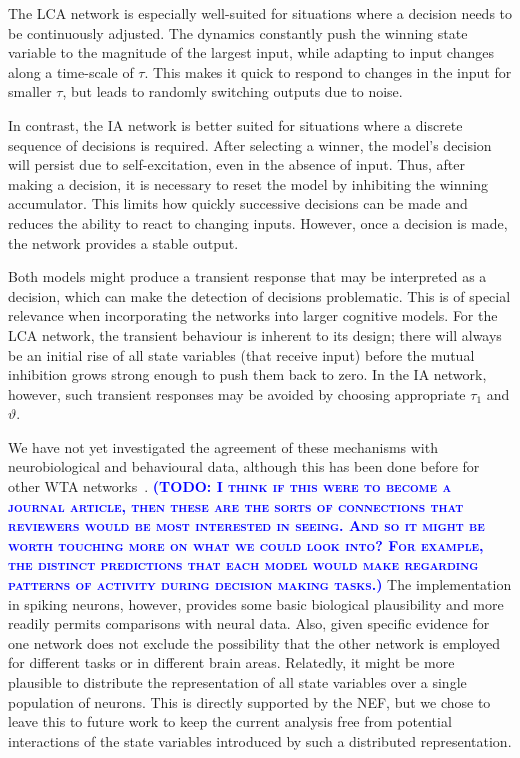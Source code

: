 \documentclass[10pt,letterpaper]{article}
\makeatletter
\newcommand{\todo}[1]{\textbf{\textsc{\textcolor{blue}{(TODO\@: #1)}}}}
\makeatother
\begin{document}
The LCA network is especially well-suited for situations where a decision needs to be continuously adjusted.
The dynamics constantly push the winning state variable to the magnitude of the largest input, while adapting to input changes along a time-scale of $\tau$.
This makes it quick to respond to changes in the input for smaller $\tau$, but leads to randomly switching outputs due to noise.

In contrast, the IA network is better suited for situations where a discrete sequence of decisions is required.
After selecting a winner, the model's decision will persist due to self-excitation, even in the absence of input.
Thus, after making a decision, it is necessary to reset the model by inhibiting the winning accumulator.
This limits how quickly successive decisions can be made and reduces the ability to react to changing inputs.
However, once a decision is made, the network provides a stable output.

Both models might produce a transient response that may be interpreted as a decision, which can make the detection of decisions problematic.
This is of special relevance when incorporating the networks into larger cognitive models.
For the LCA network, the transient behaviour is inherent to its design; there will always be an initial rise of all state variables (that receive input) before the mutual inhibition grows strong enough to push them back to zero.
In the IA network, however, such transient responses may be avoided by choosing appropriate $\tau_1$ and $\vartheta$.


We have not yet investigated the agreement of these mechanisms with neurobiological and behavioural data, although this has been done before for other WTA networks~\cite{gold2007,smith2004}.
\todo{I think if this were to become a journal article, then these are the sorts of connections that reviewers would be most interested in seeing. And so it might be worth touching more on what we could look into? For example, the distinct predictions that each model would make regarding patterns of activity during decision making tasks.}
The implementation in spiking neurons, however, provides some basic biological plausibility and more readily permits comparisons with neural data.
Also, given specific evidence for one network does not exclude the possibility that the other network is employed for different tasks or in different brain areas.
Relatedly, it might be more plausible to distribute the representation of all state variables over a single population of neurons.
This is directly supported by the NEF, but we chose to leave this to future work to keep the current analysis free from potential interactions of the state variables introduced by such a distributed representation.
\end{document}
